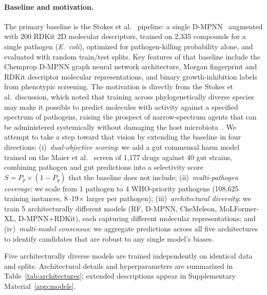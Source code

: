 \documentclass{article}
\begin{document}
\paragraph{Baseline and motivation.}
The primary baseline is the Stokes et al.~\citep{stokes2020} pipeline: a single D-MPNN~\citep{yang2019} augmented with 200 RDKit 2D molecular descriptors, trained on 2,335 compounds for a single pathogen (\textit{E.~coli}), optimized for pathogen-killing probability alone, and evaluated with random train/test splits.
Key features of that baseline include the Chemprop D-MPNN graph neural network architecture, Morgan fingerprint and RDKit descriptor molecular representations, and binary growth-inhibition labels from phenotypic screening.
The motivation is directly from the Stokes et al.\ discussion, which noted that training across phylogenetically diverse species may make it possible to predict molecules with activity against a specified spectrum of pathogens, raising the prospect of narrow-spectrum agents that can be administered systemically without damaging the host microbiota~\citep{stokes2020}.
We attempt to take a step toward that vision by extending the baseline in four directions:
(i)~\emph{dual-objective scoring}: we add a gut commensal harm model trained on the Maier et al.~\citep{maier2018} screen of 1,177 drugs against 40 gut strains, combining pathogen and gut predictions into a selectivity score $S = P_p \times (1 - P_g)$ that the baseline does not include;
(ii)~\emph{multi-pathogen coverage}: we scale from 1 pathogen to 4 WHO-priority pathogens (108,625 training instances, 8--19$\times$ larger per pathogen);
(iii)~\emph{architectural diversity}: we train 5 architecturally different models (RF, D-MPNN, CheMeleon, MoLFormer-XL, D-MPNN+RDKit), each capturing different molecular representations; and
(iv)~\emph{multi-model consensus}: we aggregate predictions across all five architectures to identify candidates that are robust to any single model's biases.

Five architecturally diverse models are trained independently on identical data and splits.
Architectural details and hyperparameters are summarized in Table~\ref{tab:architectures}; extended descriptions appear in Supplementary Material~\ref{app:models}.
\end{document}
